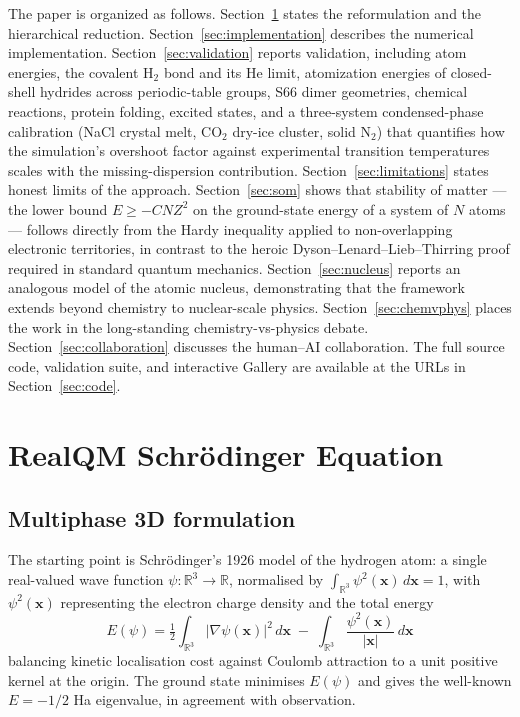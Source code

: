 \documentclass[11pt]{article}
\begin{document}
The paper is organized as follows. Section~\ref{sec:reformulation} states the reformulation and the hierarchical reduction. Section~\ref{sec:implementation} describes the numerical implementation. Section~\ref{sec:validation} reports validation, including atom energies, the covalent H$_2$ bond and its He limit, atomization energies of closed-shell hydrides across periodic-table groups, S66 dimer geometries, chemical reactions, protein folding, excited states, and a three-system condensed-phase calibration (NaCl crystal melt, CO$_2$ dry-ice cluster, solid N$_2$) that quantifies how the simulation's overshoot factor against experimental transition temperatures scales with the missing-dispersion contribution. Section~\ref{sec:limitations} states honest limits of the approach. Section~\ref{sec:som} shows that stability of matter --- the lower bound $E \ge -C N Z^2$ on the ground-state energy of a system of $N$ atoms --- follows directly from the Hardy inequality applied to non-overlapping electronic territories, in contrast to the heroic Dyson--Lenard--Lieb--Thirring proof required in standard quantum mechanics. Section~\ref{sec:nucleus} reports an analogous model of the atomic nucleus, demonstrating that the framework extends beyond chemistry to nuclear-scale physics. Section~\ref{sec:chemvphys} places the work in the long-standing chemistry-vs-physics debate. Section~\ref{sec:collaboration} discusses the human--AI collaboration. The full source code, validation suite, and interactive Gallery are available at the URLs in Section~\ref{sec:code}.

\section{RealQM Schr\"odinger Equation}\label{sec:reformulation}

\subsection{Multiphase 3D formulation}

The starting point is Schr\"odinger's 1926 model of the hydrogen atom: a single real-valued wave function $\psi : \mathbb{R}^3 \to \mathbb{R}$, normalised by $\int_{\mathbb{R}^3} \psi^2(\mathbf{x})\,d\mathbf{x} = 1$, with $\psi^2(\mathbf{x})$ representing the electron charge density and the total energy
\begin{equation}\label{eq:H-energy}
E(\psi) = \tfrac{1}{2} \int_{\mathbb{R}^3} |\nabla \psi(\mathbf{x})|^2 \, d\mathbf{x}
\;-\; \int_{\mathbb{R}^3} \frac{\psi^2(\mathbf{x})}{|\mathbf{x}|}\, d\mathbf{x}
\end{equation}
balancing kinetic localisation cost against Coulomb attraction to a unit positive kernel at the origin. The ground state minimises $E(\psi)$ and gives the well-known $E = -1/2$ Ha eigenvalue, in agreement with observation.
\end{document}
